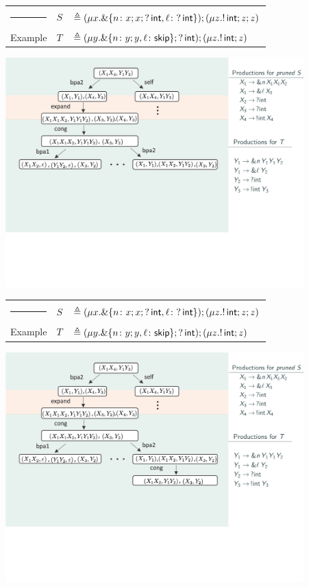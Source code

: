 \message{ !name(main.tex)}\documentclass[10pt]{beamer}
\begin{document}
\begin{frame}
	\begin{tabular} {l l l }
  		{\color{teal}\rule{3cm}{2pt}} &  $S$ &$\triangleq (\mu x. \&\{n\colon x;x;?\,\mathsf{int},
      \ell\colon ?\,\mathsf{int} \});( \mu z. !\,\mathsf{int}; z;z )$\\
  		{\color{teal} Example}  &  $T$ &$\triangleq (\mu y. \&\{n\colon y;y,
      \ell\colon \mathsf{skip} \}; ?\,\mathsf{int}); (\mu z. !\,\mathsf{int}; z)$
	\end{tabular}
	\vspace*{2mm}
	\includegraphics[width=11.5cm]{img/exemplo-5}\smallskip
\end{frame}

\begin{frame}
	\begin{tabular} {l l l }
  		{\color{teal}\rule{3cm}{2pt}} &  $S$ &$\triangleq (\mu x. \&\{n\colon x;x;?\,\mathsf{int},
      \ell\colon ?\,\mathsf{int} \});( \mu z. !\,\mathsf{int}; z;z )$\\
  		{\color{teal} Example}  &  $T$ &$\triangleq (\mu y. \&\{n\colon y;y,
      \ell\colon \mathsf{skip} \}; ?\,\mathsf{int}); (\mu z. !\,\mathsf{int}; z)$
	\end{tabular}
	\vspace*{2mm}
	\includegraphics[width=11.5cm]{img/exemplo-4}\smallskip
\end{frame}
\end{document}
